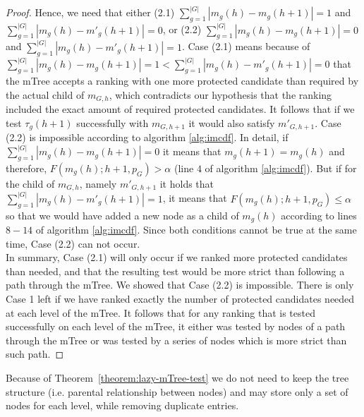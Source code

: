 \begin{proof}
	Hence, we need that either
	(2.1) $\sum_{g=1}^{|G|} |m_{g}(h) - m_g(h+1)| = 1$ and $\sum_{g=1}^{|G|} |m_{g}(h) - m'_g(h+1)| = 0$,
	or
	(2.2) $\sum_{g=1}^{|G|} |m_{g}(h) - m_g(h+1)| = 0$ and $\sum_{g=1}^{|G|} |m_{g}(h) - m'_g(h+1)| = 1$.
	Case (2.1) means because of $\sum_{g=1}^{|G|} |m_{g}(h) - m_g(h+1)| = 1 < \sum_{g=1}^{|G|} |m_{g}(h) - m'_g(h+1)| = 0$ that the mTree accepts a ranking with one more protected candidate than required by the actual child of $m_{G,h}$, which contradicts our hypothesis that the ranking included the exact amount of required protected candidates. It follows that if we test $\tau_g (h+1)$ successfully with $m_{G,h+1}$ it would also satisfy ${m'}_{G,h+1}$.
Case (2.2) is impossible according to algorithm \ref{alg:imcdf}.
In detail, if $\sum_{g=1}^{|G|} |m_{g}(h) - m_g(h+1)| = 0$ it means that $ m_g(h+1) = m_{g}(h)$ and therefore, $F(m_{g}(h);h+1,p_G) > \alpha$ (line $4$ of algorithm \ref{alg:imcdf}). But if for the child of $m_{G,h}$, namely ${m'}_{G,h+1}$ it holds that $\sum_{g=1}^{|G|} |m_{g}(h) - m'_g(h+1)| = 1$, it means that
$F(m_{g}(h);h+1,p_G) \leq \alpha$ so that we would have added a new node as a child of $m_{g}(h)$ according to lines  $8-14$ of algorithm \ref{alg:imcdf}. Since both conditions cannot be true at the same time, Case (2.2) can not occur.
\\
In summary, Case (2.1) will only occur if we ranked more protected candidates than needed, and that the resulting test would be more strict than following a path through the mTree.
%
We showed that Case (2.2) is impossible. There is only Case 1 left if we have ranked exactly the number of protected candidates needed at each level of the mTree.
%
It follows that for any ranking that is tested successfully on each level of the mTree, it either was tested by nodes of a path through the mTree or was tested by a series of nodes which is more strict than such path.
\end{proof}
%
\noindent Because of Theorem~\ref{theorem:lazy-mTree-test} we do not need to keep the tree structure (i.e. parental relationship between nodes) and may store only a set of nodes for each level, while removing duplicate entries.

